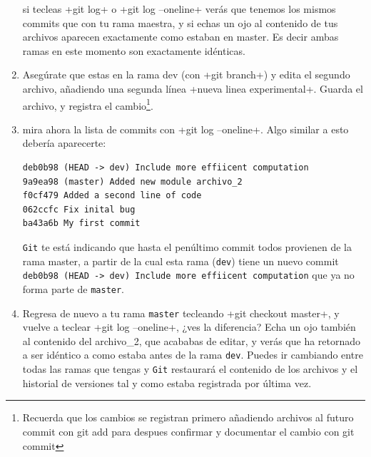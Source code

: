 \documentclass[a4paper,10pt]{article}
\begin{document}
\begin{enumerate}
    si tecleas \cverb+git log+ o \cverb+git log --oneline+ verás que tenemos los mismos commits que con tu rama maestra, y si echas un ojo al contenido de tus archivos aparecen exactamente como estaban en master. Es decir ambas ramas en este momento son exactamente idénticas.
    
    \item Asegúrate que estas en la rama dev (con \cverb+git branch+) y edita el segundo archivo, añadiendo una segunda línea \cverb+nueva linea experimental+. Guarda el archivo, y registra el cambio\footnote{Recuerda que los cambios se registran primero añadiendo archivos al futuro commit con git add para despues confirmar y documentar el cambio con git commit}.
    
    \item mira ahora la lista de commits con \cverb+git log --oneline+. Algo similar a esto debería aparecerte:
    
    \begin{lstlisting}[style=custom]
deb0b98 (HEAD -> dev) Include more effiicent computation
9a9ea98 (master) Added new module archivo_2
f0cf479 Added a second line of code
062ccfc Fix inital bug
ba43a6b My first commit
    \end{lstlisting}

    \verb+Git+ te está indicando que hasta el penúltimo commit todos provienen de la rama master, a partir de la cual esta rama (\verb+dev+) tiene un nuevo commit \verb+deb0b98 (HEAD -> dev) Include more effiicent computation+ que ya no forma parte de \verb+master+.
    
    \item Regresa de nuevo a tu rama \verb+master+ tecleando \cverb+git checkout master+, y vuelve a teclear \cverb+git log --oneline+, ¿ves la diferencia? Echa un ojo también al contenido del archivo\_2, que acababas de editar, y verás que ha retornado a ser idéntico a como estaba antes de la rama \verb+dev+. Puedes ir cambiando entre todas las ramas que tengas y \verb+Git+ restaurará el contenido de los archivos y el historial de versiones tal y como estaba registrada por última vez.
    

\end{enumerate}
\end{document}
